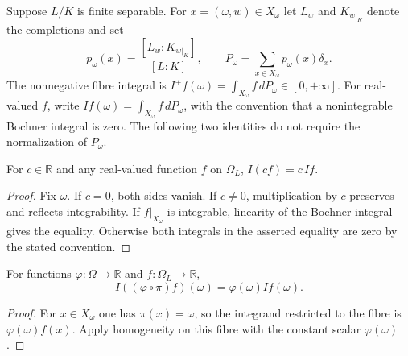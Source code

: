\begin{definition}\label{def:weighted-fibre-integral}
\leanok
{}
Suppose $L/K$ is finite separable. For $x=(\omega,w)\in X_\omega$ let
$L_w$ and $K_{w|_K}$ denote the completions and set
\[
 p_\omega(x)=\frac{[L_w:K_{w|_K}]}{[L:K]},\qquad
 P_\omega=\sum_{x\in X_\omega}p_\omega(x)\delta_x.
\]
The nonnegative fibre integral is
$I^+f(\omega)=\int_{X_\omega} f\,dP_\omega\in[0,+\infty]$.
For real-valued $f$, write $If(\omega)=\int_{X_\omega}f\,dP_\omega$,
with the convention that a nonintegrable Bochner integral is zero.
The following two identities do not require the normalization of $P_\omega$.
\end{definition}

\begin{lemma}[Homogeneity]\label{lem:fibre-homogeneity}
\leanok
{}
For $c\in\mathbb R$ and any real-valued function $f$ on $\Omega_L$,
$I(cf)=c\,If$.
\end{lemma}
\begin{proof}
Fix $\omega$. If $c=0$, both sides vanish. If $c\ne0$, multiplication by
$c$ preserves and reflects integrability. If $f|_{X_\omega}$ is integrable,
linearity of the Bochner integral gives the equality. Otherwise both integrals
in the asserted equality are zero by the stated convention.
\end{proof}

\begin{proposition}\label{prop:fibre-base-multiplication}
\leanok
{}
For functions $\varphi:\Omega\to\mathbb R$ and $f:\Omega_L\to\mathbb R$,
\[
 I((\varphi\circ\pi)f)(\omega)=\varphi(\omega)If(\omega).
\]
\end{proposition}
\begin{proof}
For $x\in X_\omega$ one has $\pi(x)=\omega$, so the integrand restricted
to the fibre is $\varphi(\omega)f(x)$. Apply homogeneity on this fibre with
the constant scalar $\varphi(\omega)$.
\end{proof}
